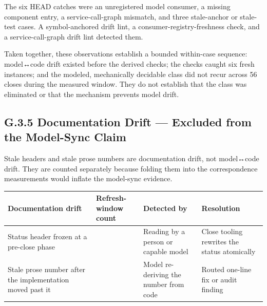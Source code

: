 The six HEAD catches were an unregistered model consumer, a missing component entry, a service-call-graph mismatch, and three stale-anchor or stale-test cases. A symbol-anchored drift lint, a consumer-registry-freshness check, and a service-call-graph drift lint detected them.

Taken together, these observations establish a bounded within-case sequence: model↔code drift existed before the derived checks; the checks caught six fresh instances; and the modeled, mechanically decidable class did not recur across 56 closes during the measured window. They do not establish that the class was eliminated or that the mechanism prevents model drift.

\subsection{G.3.5 Documentation Drift --- Excluded from the Model-Sync Claim}\label{heading:doc-hygiene-aside}

Stale headers and stale prose numbers are documentation drift, not model↔code drift. They are counted separately because folding them into the correspondence measurements would inflate the model-sync evidence.

{\footnotesize
{\def\LTcaptype{none} %
\begin{longtable}[]{@{}
  >{\raggedright\arraybackslash}p{}
  >{\raggedright\arraybackslash}p{}
  >{\raggedright\arraybackslash}p{}
  >{\raggedright\arraybackslash}p{}@{}}
\toprule\noalign{}
\begin{minipage}[b]{\linewidth}\raggedright
Documentation drift
\end{minipage} & \begin{minipage}[b]{\linewidth}\raggedright
Refresh-window count
\end{minipage} & \begin{minipage}[b]{\linewidth}\raggedright
Detected by
\end{minipage} & \begin{minipage}[b]{\linewidth}\raggedright
Resolution
\end{minipage} \\
\midrule\noalign{}
\endhead
\bottomrule\noalign{}
\endlastfoot

Status header frozen at a pre-close phase & 11 & Reading by a person or capable model & Close tooling rewrites the status atomically \\
Stale prose number after the implementation moved past it & 9 & Model re-deriving the number from code & Routed one-line fix or audit finding \\
\end{longtable}
}
}

